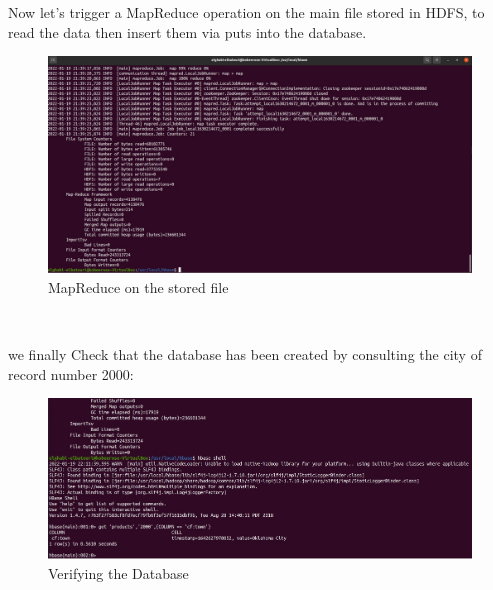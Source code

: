 \begin{spacing}{1.2}
\par Now let's trigger a MapReduce operation on the main file stored in
HDFS, to read the data then insert them via puts into the database.
\\
\begin{figure}[!htb] 
\begin{center} 
\includegraphics[width=1\linewidth]{Pictures/HBase/Using the HBase Java API/MapReduce on stored file/MapReduce on the stored file} 
\end{center} 
\caption{MapReduce on the stored file} 
\end{figure}  \FloatBarrier
\\
\newpage
\par we finally Check that the database has been created by consulting the city of record number 2000:
\\
\begin{figure}[!htb] 
\begin{center} 
\includegraphics[width=1\linewidth]{Pictures/HBase/Using the HBase Java API/MapReduce on stored file/Verifying the Database} 
\end{center} 
\caption{Verifying the Database} 
\end{figure}  \FloatBarrier
\\

\end{spacing}